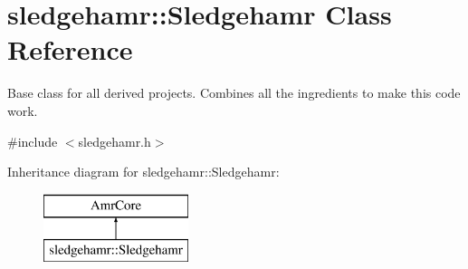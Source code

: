 \hypertarget{classsledgehamr_1_1Sledgehamr}{}\section{sledgehamr\+:\+:Sledgehamr Class Reference}
\label{classsledgehamr_1_1Sledgehamr}


Base class for all derived projects. Combines all the ingredients to make this code work.  




{\ttfamily \#include $<$sledgehamr.\+h$>$}

Inheritance diagram for sledgehamr\+:\+:Sledgehamr\+:\begin{figure}[H]
\begin{center}
\leavevmode
\includegraphics[height=2.000000cm]{classsledgehamr_1_1Sledgehamr}
\end{center}
\end{figure}

